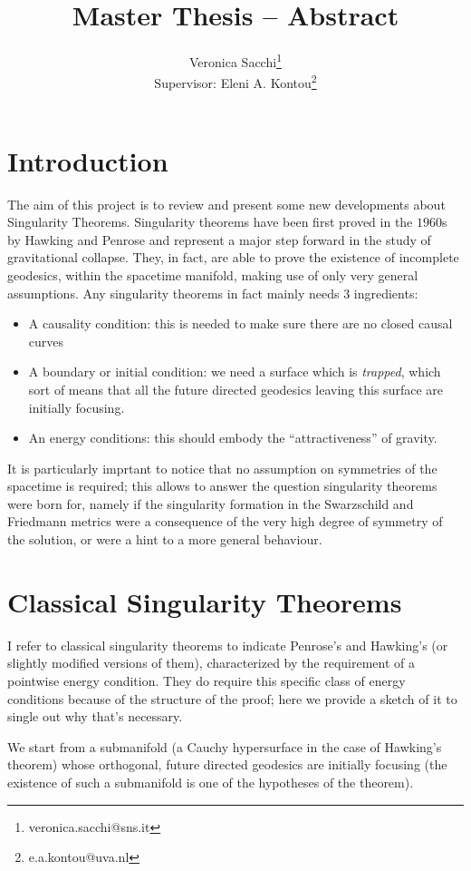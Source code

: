 \documentclass[12pt, a4paper]{article}
\title{Master Thesis -- Abstract}
\author{Veronica Sacchi\thanks{veronica.sacchi@sns.it}\\
Supervisor: Eleni A. Kontou\thanks{e.a.kontou@uva.nl}}
\begin{document}
\maketitle

\section{Introduction}
The aim of this project is to review and present some new developments about Singularity Theorems.
Singularity theorems have been first proved in the \(1960\)s by Hawking \cite{hawking1966occurrence} and Penrose \cite{penrose1965gravitational} and represent a major step forward in the study of gravitational collapse.
They, in fact, are able to prove  the existence of incomplete geodesics, within the spacetime manifold, making use of only very general assumptions.
Any singularity theorems in fact mainly needs \(3\) ingredients:
\begin{itemize}
	\item A causality condition: this is needed to make sure there are no closed causal curves
	\item A boundary or initial condition: we need a surface which is \emph{trapped}, which sort of means that all the future directed geodesics leaving this surface are initially focusing.
	\item An energy conditions: this should embody the ``attractiveness'' of gravity.
\end{itemize}

It is particularly imprtant to notice that no assumption on symmetries of the spacetime is required; this allows to answer the question singularity theorems were born for, namely if the singularity formation in the Swarzschild and Friedmann metrics were a consequence of the very high degree of symmetry of the solution, or were a hint to a more general behaviour.

\section{Classical Singularity Theorems}
I refer to classical singularity theorems to indicate Penrose's and Hawking's (or slightly modified versions of them), characterized by the requirement of a pointwise energy condition.
They do require this specific class of energy conditions because of the structure of the proof; here we provide a sketch of it to single out why that's necessary.

We start from a submanifold (a Cauchy hypersurface in the case of Hawking's theorem) whose orthogonal, future directed geodesics are initially focusing (the existence of such a submanifold is one of the hypotheses of the theorem).
\end{document}
